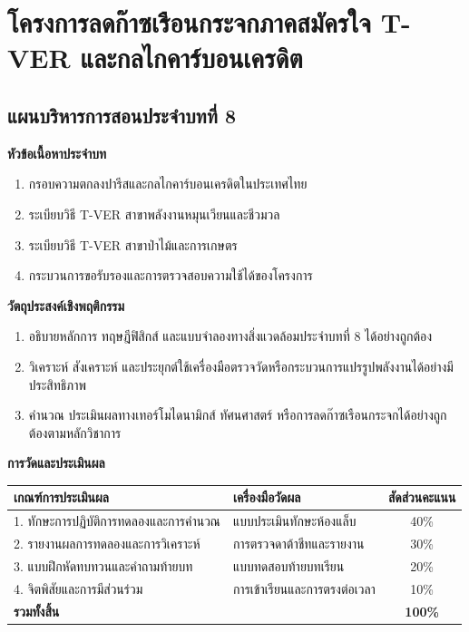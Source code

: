 \chapter{โครงการลดก๊าซเรือนกระจกภาคสมัครใจ T-VER และกลไกคาร์บอนเครดิต}
\label{chap:ch08}

\section*{แผนบริหารการสอนประจำบทที่ 8}

\noindent\textbf{หัวข้อเนื้อหาประจำบท}
\begin{enumerate}
    \item กรอบความตกลงปารีสและกลไกคาร์บอนเครดิตในประเทศไทย
    \item ระเบียบวิธี T-VER สาขาพลังงานหมุนเวียนและชีวมวล
    \item ระเบียบวิธี T-VER สาขาป่าไม้และการเกษตร
    \item กระบวนการขอรับรองและการตรวจสอบความใช้ได้ของโครงการ
\end{enumerate}

\noindent\textbf{วัตถุประสงค์เชิงพฤติกรรม}
\begin{enumerate}
    \item อธิบายหลักการ ทฤษฎีฟิสิกส์ และแบบจำลองทางสิ่งแวดล้อมประจำบทที่ 8 ได้อย่างถูกต้อง
    \item วิเคราะห์ สังเคราะห์ และประยุกต์ใช้เครื่องมือตรวจวัดหรือกระบวนการแปรรูปพลังงานได้อย่างมีประสิทธิภาพ
    \item คำนวณ ประเมินผลทางเทอร์โมไดนามิกส์ ทัศนศาสตร์ หรือการลดก๊าซเรือนกระจกได้อย่างถูกต้องตามหลักวิชาการ
\end{enumerate}

\noindent\textbf{การวัดและประเมินผล}
\begin{table}[H]
\centering\small
\begin{tabularx}{\textwidth}{p{} p{} c}
\toprule
\textbf{เกณฑ์การประเมินผล} & \textbf{เครื่องมือวัดผล} & \textbf{สัดส่วนคะแนน} \\
\midrule
1. ทักษะการปฏิบัติการทดลองและการคำนวณ & แบบประเมินทักษะห้องแล็บ & 40\% \\
2. รายงานผลการทดลองและการวิเคราะห์ & การตรวจดาต้าชีทและรายงาน & 30\% \\
3. แบบฝึกหัดทบทวนและคำถามท้ายบท & แบบทดสอบท้ายบทเรียน & 20\% \\
4. จิตพิสัยและการมีส่วนร่วม & การเข้าเรียนและการตรงต่อเวลา & 10\% \\
\midrule
\textbf{รวมทั้งสิ้น} & & \textbf{100\%} \\
\bottomrule
\end{tabularx}
\end{table}
\newpage

